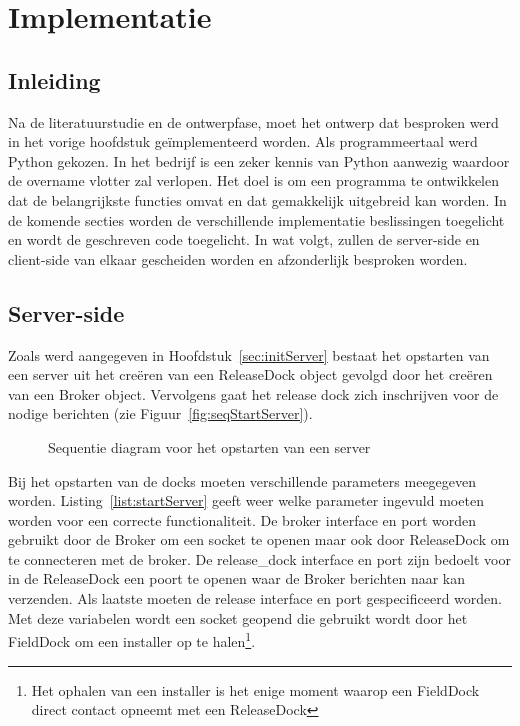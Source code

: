 \chapter{Implementatie}
\section{Inleiding}
Na de literatuurstudie en de ontwerpfase, moet het ontwerp dat besproken werd in het vorige hoofdstuk geïmplementeerd worden.
Als programmeertaal werd Python gekozen.
In het bedrijf is een zeker kennis van Python aanwezig waardoor de overname vlotter zal verlopen.
Het doel is om een programma te ontwikkelen dat de belangrijkste functies omvat en dat gemakkelijk uitgebreid kan worden.
In de komende secties worden de verschillende implementatie beslissingen toegelicht en wordt de geschreven code toegelicht.
In wat volgt, zullen de server-side en client-side van elkaar gescheiden worden en afzonderlijk besproken worden.

\section{Server-side}
Zoals werd aangegeven in Hoofdstuk~\ref{sec:initServer} bestaat het opstarten van een server uit het creëren van een ReleaseDock object gevolgd door het creëren van een Broker object.
Vervolgens gaat het release dock zich inschrijven voor de nodige berichten (zie Figuur~\vref{fig:seqStartServer}).

\begin{figure}[!ht]
\centering
{}
\caption{Sequentie diagram voor het opstarten van een server}
\label{fig:seqStartServer}
\end{figure}

Bij het opstarten van de docks moeten verschillende parameters meegegeven worden.
Listing~\ref{list:startServer} geeft weer welke parameter ingevuld moeten worden voor een correcte functionaliteit.
De broker interface en port worden gebruikt door de Broker om een socket te openen maar ook door ReleaseDock om te connecteren met de broker.
De release\_dock interface en port zijn bedoelt voor in de ReleaseDock een poort te openen waar de Broker berichten naar kan verzenden.
Als laatste moeten de release interface en port gespecificeerd worden.
Met deze variabelen wordt een socket geopend die gebruikt wordt door het FieldDock om een installer op te halen\footnote{Het ophalen van een installer is het enige moment waarop een FieldDock direct contact opneemt met een ReleaseDock}.			

